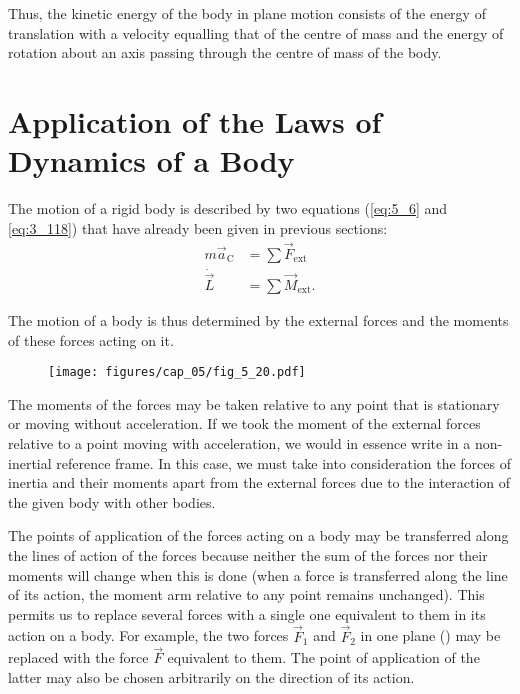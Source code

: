 Thus, the kinetic energy of the body in plane motion consists of the energy of translation with a velocity equalling that of the centre of mass and the energy of rotation about an axis passing through the centre of mass of the body.

\section{Application of the Laws of Dynamics of a Body}\label{sec:5_8}

The motion of a rigid body is described by two equations (\eqref{eq:5_6} and \eqref{eq:3_118}) that have already been given in previous sections:
\begin{align*}
	m\vec{a}_{\text{C}} &= \sum\vec{F}_{\text{ext}}\\
	\dot{\vec{L}} &= \sum\vec{M}_{\text{ext}}.
\end{align*}

\noindent
The motion of a body is thus determined by the external forces and the moments of these forces acting on it.

\begin{figure}[t]
	\begin{center}
		\texttt{[image: figures/cap\_05/fig\_5\_20.pdf]}
		\caption[]{}
		\label{fig:5_20}
	\end{center}
	\vspace{-1.0cm}
\end{figure}

The moments of the forces may be taken relative to any point that is stationary or moving without acceleration. If we took the moment of the external forces relative to a point moving with acceleration, we would in essence write  in a non-inertial reference frame. In this case, we must take into consideration the forces of inertia and their moments apart from the external forces due to the interaction of the given body with other bodies.

The points of application of the forces acting on a body may be transferred along the lines of action of the forces because neither the sum of the forces nor their moments will change when this is done (when a force is transferred along the line of its action, the moment arm relative to any point remains unchanged). This permits us to replace several forces with a single one equivalent to them in its action on a body. For example, the two forces $\vec{F}_1$ and $\vec{F}_2$ in one plane () may be replaced with the force $\vec{F}$ equivalent to them. The point of application of the latter may also be chosen arbitrarily on the direction of its action.

